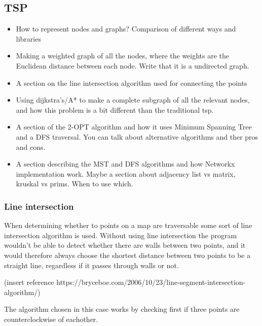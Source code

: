 \subsection{TSP}
\begin{itemize}
    \item How to represent nodes and graphs? Comparison of different ways and libraries
    \item Making a weighted graph of all the nodes, where the weights are the Euclidean distance between each node. Write that it is a undirected graph.
    \item A section on the line intersection algorithm used for connecting the points
    \item Using dijkstra's/A* to make a complete subgraph of all the relevant nodes, and how this problem is a bit different than the traditional tsp.
    \item A section of the 2-OPT algorithm and how it uses Minimum Spanning Tree and a DFS traversal. You can talk about alternative algorithms and ther pros and cons.
    \item A section describing the MST and DFS algorithms and how Networkx implementation work. Maybe a section about adjacency list vs matrix, kruskal vs prims. When to use which.
\end{itemize}

\subsubsection{Line intersection}
When determining whether to points on a map are traversable some sort of line intersection algorithm is used. Without using
line intersection the program wouldn't be able to detect whether there are walls between two points, and it would therefore always
choose the shortest distance between two points to be a straight line, regardless if it passes through walls or not. 

(insert reference https://bryceboe.com/2006/10/23/line-segment-intersection-algorithm/)

The algorithm chosen in this case works by checking first if three points are counterclockwise of eachother.




